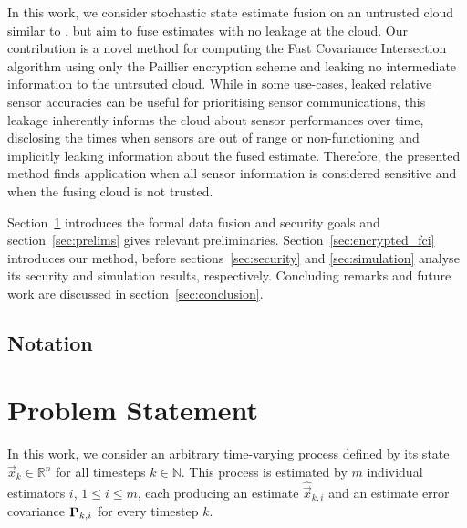 \documentclass[letterpaper, 10 pt, conference]{ieeeconf}
\begin{document}
In this work, we consider stochastic state estimate fusion on an untrusted cloud similar to \cite{risticSecureFastCovariance2021}, but aim to fuse estimates with no leakage at the cloud. Our contribution is a novel method for computing the Fast Covariance Intersection algorithm using only the Paillier encryption scheme and leaking no intermediate information to the untrsuted cloud. While in some use-cases, leaked relative sensor accuracies can be useful for prioritising sensor communications, this leakage inherently informs the cloud about sensor performances over time, disclosing the times when sensors are out of range or non-functioning and implicitly leaking information about the fused estimate. Therefore, the presented method finds application when all sensor information is considered sensitive and when the fusing cloud is not trusted.

Section~\ref{sec:problem} introduces the formal data fusion and security goals and section~\ref{sec:prelims} gives relevant preliminaries. Section~\ref{sec:encrypted_fci} introduces our method, before sections~\ref{sec:security} and \ref{sec:simulation} analyse its security and simulation results, respectively. Concluding remarks and future work are discussed in section~\ref{sec:conclusion}.

\subsection{Notation}


% 
%                                              
%                                              
%                                              
% 
\section{Problem Statement}\label{sec:problem}
In this work, we consider an arbitrary time-varying process defined by its state $\vec{x}_k \in \mathbb{R}^n$ for all timesteps $k \in \mathbb{N}$. This process is estimated by $m$ individual estimators $i$, $1\leq i\leq m$, each producing an estimate $\hat{\vec{x}}_{k,i}$ and an estimate error covariance ${{\mathbf{P}}}_{k,i}$ for every timestep $k$.
\end{document}

